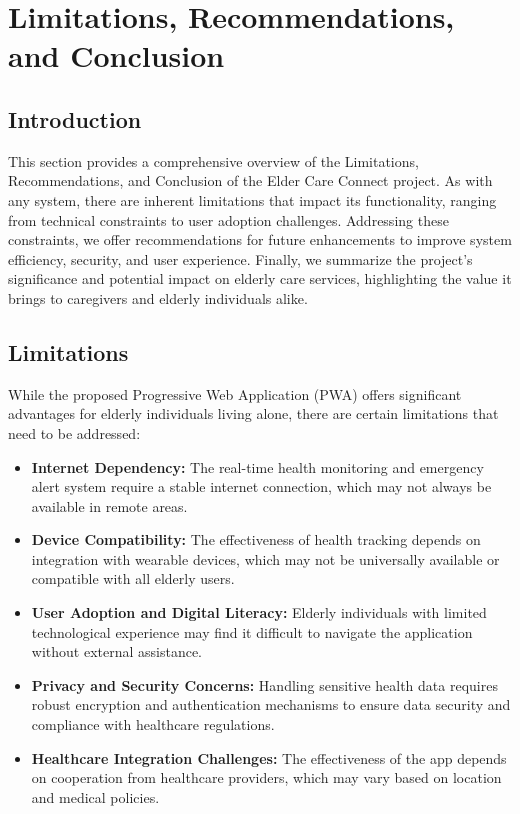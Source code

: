 \chapter{Limitations, Recommendations, and Conclusion}
\section{Introduction}
This section provides a comprehensive overview of the Limitations, Recommendations, and Conclusion of the Elder Care Connect project. As with any system, there are inherent limitations that impact its functionality, ranging from technical constraints to user adoption challenges. Addressing these constraints, we offer recommendations for future enhancements to improve system efficiency, security, and user experience. Finally, we summarize the project’s significance and potential impact on elderly care services, highlighting the value it brings to caregivers and elderly individuals alike.
\section{Limitations}
While the proposed Progressive Web Application (PWA) offers significant advantages for elderly individuals living alone, there are certain limitations that need to be addressed:
\begin{itemize}
    \item \textbf{Internet Dependency:} The real-time health monitoring and emergency alert system require a stable internet connection, which may not always be available in remote areas.
    \item \textbf{Device Compatibility:} The effectiveness of health tracking depends on integration with wearable devices, which may not be universally available or compatible with all elderly users.
    \item \textbf{User Adoption and Digital Literacy:} Elderly individuals with limited technological experience may find it difficult to navigate the application without external assistance.
    \item \textbf{Privacy and Security Concerns:} Handling sensitive health data requires robust encryption and authentication mechanisms to ensure data security and compliance with healthcare regulations.
    \item \textbf{Healthcare Integration Challenges:} The effectiveness of the app depends on cooperation from healthcare providers, which may vary based on location and medical policies.
\end{itemize}
